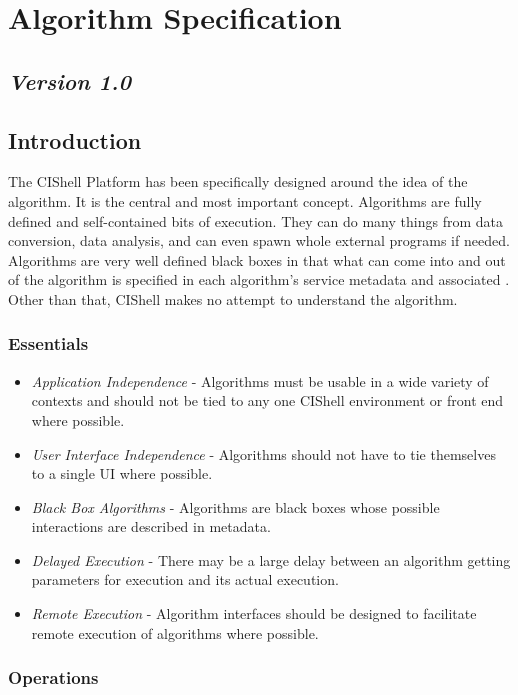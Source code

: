 \section{Algorithm Specification}

\subsection*{\textit{Version 1.0}}

\subsection{Introduction}

The CIShell Platform has been specifically designed around the idea of the
algorithm. It is the central and most important concept. Algorithms are fully
defined and self-contained bits of execution. They can do many things from data
conversion, data analysis, and can even spawn whole external programs if needed.
Algorithms are very well defined black boxes in that what can come into and out
of the algorithm is specified in each algorithm's service metadata and
associated . Other than that, CIShell makes no attempt
to understand the algorithm.

\subsubsection{Essentials}
\begin{itemize}
  \item \textit{Application Independence} - Algorithms must be usable in a wide
  variety of contexts and should not be tied to any one CIShell environment or
  front end where possible.
  \item \textit{User Interface Independence} - Algorithms should not have to tie
  themselves to a single UI where possible.
  \item \textit{Black Box Algorithms} - Algorithms are black boxes whose
  possible interactions are described in metadata.
  \item \textit{Delayed Execution} - There may be a large delay between an
  algorithm getting parameters for execution and its actual execution.
  \item \textit{Remote Execution} - Algorithm interfaces should be designed to
  facilitate remote execution of algorithms where possible.
\end{itemize}

\subsubsection{Operations}

